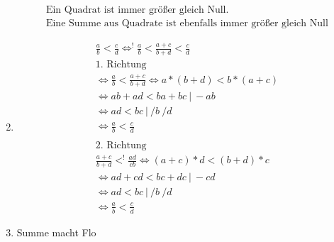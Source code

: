 \documentclass{article}
\begin{document}
\begin{enumerate}[label = (\alph*)]
\begin{gather*}
                    \text{Ein Quadrat ist immer größer gleich Null.} \\
                    \text{Eine Summe aus Quadrate ist ebenfalls immer größer gleich Null}
                \end{gather*}
            \item 
                \begin{gather*}
                    \frac{a}{b} < \frac{c}{d} \Leftrightarrow^! \frac{a}{b} < \frac{a+c}{b+d} < \frac{c}{d} \\
                    \text{1. Richtung} \\
                    \Leftrightarrow \frac{a}{b} < \frac{a+c}{b+d} \Leftrightarrow a * (b + d) < b * (a + c) \\
                    \Leftrightarrow ab + ad < ba + bc \: | \: - ab \\
                    \Leftrightarrow ad < bc \: | \: /b \: /d\\
                    \Leftrightarrow \frac{a}{b} < \frac{c}{d} \\
                    \\
                    \text{2. Richtung} \\
                    \frac{a+c}{b+d} <^! \frac{ad}{cb} \Leftrightarrow (a+c)*d < (b+d)*c \\
                    \Leftrightarrow ad + cd < bc + dc \: | \: -cd \\
                    \Leftrightarrow ad < bc \: | \: /b \: /d \\
                    \Leftrightarrow \frac{a}{b} < \frac{c}{d}
                \end{gather*}
            \item
                Summe macht Flo
        \end{enumerate}
    
\end{document}
